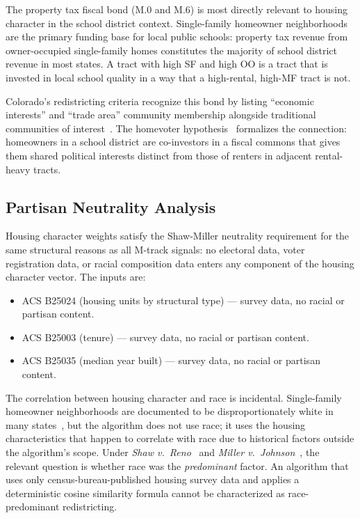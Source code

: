 The property tax fiscal bond (M.0 and M.6) is most directly relevant to
housing character in the school district context.
Single-family homeowner neighborhoods are the primary funding base for
local public schools: property tax revenue from owner-occupied single-family
homes constitutes the majority of school district revenue in most states.
A tract with high SF and high OO is a tract that is invested in local school
quality in a way that a high-rental, high-MF tract is not.

Colorado's redistricting criteria recognize this bond by listing ``economic
interests'' and ``trade area'' community membership alongside traditional
communities of interest~\citep{coart5s44}.
The homevoter hypothesis~\citep{fischel2001} formalizes the connection:
homeowners in a school district are co-investors in a fiscal commons that
gives them shared political interests distinct from those of renters in
adjacent rental-heavy tracts.

\subsection{Partisan Neutrality Analysis}

Housing character weights satisfy the Shaw-Miller neutrality requirement
for the same structural reasons as all M-track signals: no electoral data,
voter registration data, or racial composition data enters any component of
the housing character vector.
The inputs are:
\begin{itemize}
  \item ACS B25024 (housing units by structural type) --- survey data,
    no racial or partisan content.
  \item ACS B25003 (tenure) --- survey data, no racial or partisan content.
  \item ACS B25035 (median year built) --- survey data, no racial or partisan content.
\end{itemize}
The correlation between housing character and race is incidental.
Single-family homeowner neighborhoods are documented to be disproportionately
white in many states~\citep{rothstein2017}, but the algorithm does not use
race; it uses the housing characteristics that happen to correlate with race
due to historical factors outside the algorithm's scope.
Under \textit{Shaw v.\ Reno}~\citeyearpar{shaw1993} and \textit{Miller v.\
Johnson}~\citeyearpar{miller1995}, the relevant question is whether race was
the \emph{predominant} factor.
An algorithm that uses only census-bureau-published housing survey data and
applies a deterministic cosine similarity formula cannot be characterized as
race-predominant redistricting.

